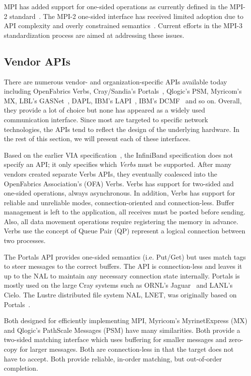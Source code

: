 MPI has added support for one-sided operations as currently defined
in the MPI-2 standard~\cite{geist96:_mpi2_lyon}. The MPI-2 one-sided
interface has received limited adoption due to API complexity and
overly constrained semantics~\cite{bonachea-upc-mpi2}. Current efforts
in the MPI-3 standardization process are aimed at addressing these
issues. 


\subsection{Vendor APIs} There are numerous vendor- and
organization-specific APIs available today including OpenFabrics
Verbs, Cray/Sandia's Portals~\cite{portals}, Qlogic's
PSM, Myricom's MX, LBL's GASNet~\cite{gasnet}, 
DAPL, IBM's LAPI~\cite{lapi_a_1998}, IBM's 
DCMF~\cite{Kumar:2008:DCM:1375527.1375544} and so on. 
Overall, they provide a lot of choice but none has appeared as 
a widely used communication interface. Since most are targeted to 
specific network technologies, the APIs tend to reflect the design 
of the underlying hardware. In the rest of this section, we will 
present each of these interfaces.

Based on the earlier VIA specification~\cite{via}, the InfiniBand specification does not specify
an API; it only specifies which \emph{Verbs} must be supported. After many vendors created
separate Verbs APIs, they eventually coalesced into the OpenFabrics Association's (OFA)
Verbs. Verbs has support for two-sided and one-sided operations, always asynchronous. 
In addition, Verbs has support for reliable and unreliable modes, connection-oriented
and connection-less. Buffer management is left to the application, all receives must be 
posted before sending. Also, all data movement operations require registering the memory 
in advance. Verbs use the concept of Queue Pair (QP) represent a logical connection between 
two processes.

The Portals API provides one-sided semantics (i.e.  Put/Get) but uses match tags to steer
messages to the correct buffers. The API is connection-less and leaves it up to the NAL to
maintain any necessary connection state internally. Portals is mostly used on the large
Cray systems such as ORNL's Jaguar~\cite{jaguar_cug_2010} and LANL's Cielo.  The
Lustre distributed file system NAL, LNET, was originally based on Portals~\cite{lnet}.

Both designed for efficiently implementing MPI, Myricom's MyrinetExpress (MX) and 
Qlogic's PathScale Messages (PSM) have many similarities. Both provide a two-sided matching 
interface which uses buffering for smaller messages and zero-copy for larger messages.  
Both are connection-less in that the target does not have to accept.  Both provide reliable,
in-order matching, but out-of-order completion.

